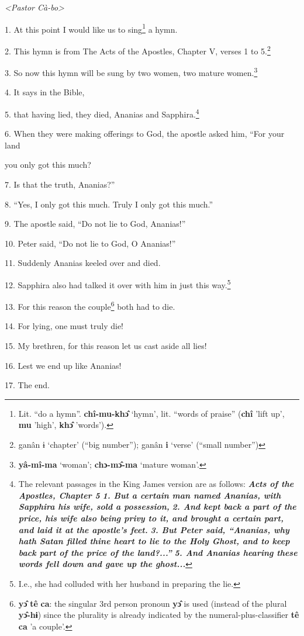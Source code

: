 \setcounter{footnote}{0}

\textit{<Pastor Cà-bo> }

1. At this point I would like us to sing\footnote{Lit. ``do a hymn''. \textbf{chî-mu-khɔ̂} `hymn', lit. ``words of praise'' (\textbf{chî} 'lift up', \textbf{mu} 'high', \textbf{khɔ̂} 'words').} a hymn.

2. This hymn is from The Acts of the Apostles, Chapter V, verses 1 to 5.\footnote{ganân ɨ `chapter' (``big number''); ganân \textbf{i} `verse' (``small number'')}

3. So now this hymn will be sung by two women, two mature women.\footnote{\textbf{yâ-mî-ma} `woman'; \textbf{chɔ-mɔ̂-ma} `mature woman'.}

\textit{}

4. It says in the Bible,

5. that having lied, they died, Ananias and Sapphira.\footnote{The relevant passages in the King James version are as follows: \textit{\textbf{Acts of the Apostles, Chapter 5}} \textit{\textbf{1. But a certain man named Ananias, with Sapphira his wife, sold a possession,}} \textit{\textbf{2. And kept back a part of the price, his wife also being privy to it, and brought a certain part, and laid it at the apostle's feet.}} \textit{\textbf{3. But Peter said, ``Ananias, why hath Satan filled thine heart to lie to the Holy Ghost, and to keep back part of the price of the land?...''}} \textit{\textbf{5. And Ananias hearing these words fell down and gave up the ghost...}}}

6. When they were making offerings to God, the apostle asked him, ``For your land


you only got this much?

7. Is that the truth, Ananias?''

8. ``Yes, I only got this much. Truly I only got this much.''

9. The apostle said, ``Do not lie to God, Ananias!''

10. Peter said, ``Do not lie to God, O Ananias!''

11. Suddenly Ananias keeled over and died.

12. Sapphira also had talked it over with him in just this way.\footnote{I.e., she had colluded with her husband in preparing the lie.}

13. For this reason the couple\footnote{\textbf{yɔ̂} \textbf{tê} \textbf{ca}: the singular 3rd person pronoun \textbf{yɔ̂} is used (instead of the plural \textbf{yɔ̂-hɨ}) since the plurality is already indicated by the numeral-plus-classifier \textbf{tê} \textbf{ca} 'a couple'.} both had to die.

14. For lying, one must truly die!

15. My brethren, for this reason let us cast aside all lies!

16. Lest we end up like Ananias!

17. The end.

